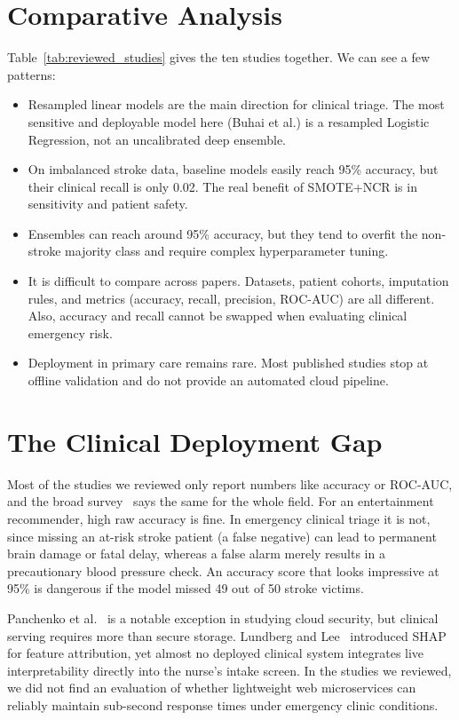 \documentclass[10pt,twocolumn,a4paper]{article}
\begin{document}
\section{Comparative Analysis}
Table~\ref{tab:reviewed_studies} gives the ten studies together. We can see a few patterns:
\begin{itemize}
    \item Resampled linear models are the main direction for clinical triage. The most sensitive and deployable model here (Buhai et al.) is a resampled Logistic Regression, not an uncalibrated deep ensemble.
    \item On imbalanced stroke data, baseline models easily reach 95\% accuracy, but their clinical recall is only 0.02. The real benefit of SMOTE+NCR is in sensitivity and patient safety.
    \item Ensembles can reach around 95\% accuracy, but they tend to overfit the non-stroke majority class and require complex hyperparameter tuning.
    \item It is difficult to compare across papers. Datasets, patient cohorts, imputation rules, and metrics (accuracy, recall, precision, ROC-AUC) are all different. Also, accuracy and recall cannot be swapped when evaluating clinical emergency risk.
    \item Deployment in primary care remains rare. Most published studies stop at offline validation and do not provide an automated cloud pipeline.
\end{itemize}

\section{The Clinical Deployment Gap}
\label{sec:gap}
Most of the studies we reviewed only report numbers like accuracy or ROC-AUC, and the broad survey~\cite{paleyes2022} says the same for the whole field. For an entertainment recommender, high raw accuracy is fine. In emergency clinical triage it is not, since missing an at-risk stroke patient (a false negative) can lead to permanent brain damage or fatal delay, whereas a false alarm merely results in a precautionary blood pressure check. An accuracy score that looks impressive at 95\% is dangerous if the model missed 49 out of 50 stroke victims.

Panchenko et al.~\cite{panchenko2024} is a notable exception in studying cloud security, but clinical serving requires more than secure storage. Lundberg and Lee~\cite{lundberg2017} introduced SHAP for feature attribution, yet almost no deployed clinical system integrates live interpretability directly into the nurse's intake screen. In the studies we reviewed, we did not find an evaluation of whether lightweight web microservices can reliably maintain sub-second response times under emergency clinic conditions.
\end{document}
